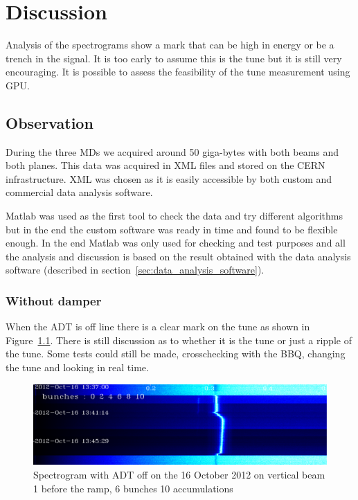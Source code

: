 
\glsresetall
\chapter{Discussion}

Analysis of the spectrograms show a mark that can be high in energy or be a trench in the signal. It is too early to assume this is the \gls{tune} but it is still very encouraging. It is possible to assess the feasibility of the tune measurement using \gls{GPU}.

\section{Observation}

During the three \glspl{MD} we acquired around 50 giga-bytes with both beams and both planes. This data was acquired in XML files and stored on the \gls{CERN} infrastructure. XML was chosen as it is easily accessible by both custom and commercial data analysis software.

Matlab was used as the first tool to check the data and try different algorithms but in the end the custom software was ready in time and found to be flexible enough. In the end Matlab was only used for checking and test purposes and all the analysis and discussion is based on the result obtained with the data analysis software (described in section~\ref{sec:data_analysis_software}).

\subsection{Without damper}

When the \gls{ADT} is off line there is a clear mark on the tune as shown in Figure~\ref{fig:adt_off}. There is still discussion as to whether it is the tune or just a ripple of the tune. Some tests could still be made, crosschecking with the \gls{BBQ}, changing the tune and looking in real time.

\begin{figure}[H]
\caption{Spectrogram with ADT off on the 16 October 2012 on vertical beam 1 before the ramp, 6 bunches 10 accumulations}
\label{fig:adt_off}
\centering
\includegraphics[scale=0.3]{md-121016-vb1-m1-6bunches-10acc-1337-1349-ADT-off.pdf}
\end{figure}

